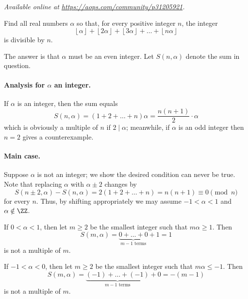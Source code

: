 \textsl{Available online at \url{https://aops.com/community/p31205921}.}
\begin{mdframed}[style=mdpurplebox,frametitle={Problem statement}]
Find all real numbers $\alpha$ so that, for every positive integer $n$, the integer
\[ \left\lfloor \alpha \right\rfloor + \left\lfloor 2 \alpha \right\rfloor
  + \left\lfloor 3 \alpha \right\rfloor + \dots + \left\lfloor n \alpha \right\rfloor \]
is divisible by $n$.
\end{mdframed}
The answer is that $\alpha$ must be an even integer.
Let $S(n, \alpha)$ denote the sum in question.

\paragraph{Analysis for $\alpha$ an integer.}
If $\alpha$ is an integer, then the sum equals
\[ S(n, \alpha) = (1+2+\dots+n) \alpha = \frac{n(n+1)}{2} \cdot \alpha \]
which is obviously a multiple of $n$ if $2 \mid \alpha$;
meanwhile, if $\alpha$ is an odd integer then $n = 2$ gives a counterexample.

\paragraph{Main case.}
Suppose $\alpha$ is not an integer; we show the desired condition can never be true.
Note that replacing $\alpha$ with $\alpha \pm 2$ changes by
\[ S(n \pm 2, \alpha) - S(n, \alpha) = 2(1+2+\dots+n) = n(n+1) \equiv 0 \pmod n \]
for every $n$.
Thus, by shifting appropriately we may assume $-1 < \alpha < 1$ and $\alpha \notin \ZZ$.

\begin{itemize}
  \ii If $0 < \alpha < 1$,
  then let $m \ge 2$ be the smallest integer such that $m \alpha \ge 1$.
  Then
  \[ S(m, \alpha) = \underbrace{0 + \dots + 0}_{m-1\text{ terms}} + 1 = 1 \]
  is not a multiple of $m$.

  \ii If $-1 < \alpha < 0$,
  then let $m \ge 2$ be the smallest integer such that $m \alpha \le -1$.
  Then
  \[ S(m, \alpha) = \underbrace{(-1) + \dots + (-1)}_{m-1\text{ terms}} + 0 = -(m-1) \]
  is not a multiple of $m$.
\end{itemize}
\pagebreak